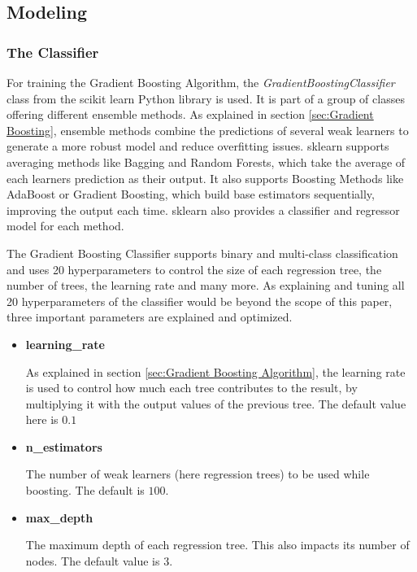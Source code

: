 \subsection{Modeling}
\label{sec:Modeling}

\subsubsection{The Classifier}

For training the Gradient Boosting Algorithm, the \emph{GradientBoostingClassifier} class from 
the scikit learn Python library is used. It is part of a group of classes offering different ensemble methods.
As explained in section \ref{sec:Gradient Boosting}, ensemble methods combine the predictions of several
weak learners to generate a more robust model and reduce overfitting issues.
sklearn supports averaging methods like Bagging and Random Forests, which take the average of each learners prediction
as their output. It also supports Boosting Methods like AdaBoost or Gradient Boosting, which
build base estimators sequentially, improving the output each time.
sklearn also provides a classifier and regressor model for each method.

The Gradient Boosting Classifier supports binary and multi-class classification and uses
20 hyperparameters to control the size of each regression tree, the number of trees,
the learning rate and many more.
As explaining and tuning all 20 hyperparameters of the classifier would be beyond the scope of this
paper, three important parameters are explained and optimized.

\begin{itemize}
    \item \textbf{learning\_rate}
    
    As explained in section \ref{sec:Gradient Boosting Algorithm}, the learning rate is used to control how
    much each tree contributes to the result, by multiplying it with the output values of the previous 
    tree. The default value here is $0.1$
    \item \textbf{n\_estimators}

    The number of weak learners (here regression trees) to be used while boosting. The default is $100$.
    \item \textbf{max\_depth}

    The maximum depth of each regression tree. This also impacts its number of nodes.
    The default value is $3$.
\end{itemize}

